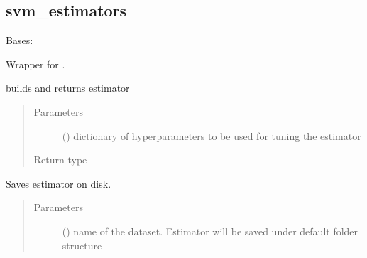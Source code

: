 \documentclass[letterpaper,10pt,english]{sphinxmanual}
\begin{document}
\subsection{svm\_estimators}
\label{\detokenize{estimators:module-mleap.estimators.svm_estimators}}\label{\detokenize{estimators:svm-estimators}}

\begin{fulllineitems}
\label{\detokenize{estimators:mleap.estimators.svm_estimators.SVC_mleap}}
Bases: {\hyperref[\detokenize{estimators:mleap.estimators.mleap_estimator.MleapEstimator}]{}}

Wrapper for .

\begin{fulllineitems}
\label{\detokenize{estimators:mleap.estimators.svm_estimators.SVC_mleap.build}}
builds and returns estimator
\begin{quote}\begin{description}
\item[{Parameters}] \leavevmode
{} () \textendash{} dictionary of hyperparameters to be used for tuning the estimator

\item[{Return type}] \leavevmode
{}

\end{description}\end{quote}

\end{fulllineitems}


\begin{fulllineitems}
\label{\detokenize{estimators:mleap.estimators.svm_estimators.SVC_mleap.save}}
Saves estimator on disk.
\begin{quote}\begin{description}
\item[{Parameters}] \leavevmode
{} () \textendash{} name of the dataset. Estimator will be saved under default folder structure 


\end{description}
\end{quote}
\end{fulllineitems}
\end{fulllineitems}
\end{document}

